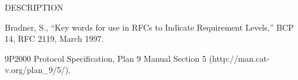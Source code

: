 DESCRIPTION

\begin{thebibliography}{0}

Bradner, S., ``Key words for use in RFCs to Indicate Requirement
Levels,'' BCP 14, RFC 2119, March 1997.


9P2000 Protocol Specification, Plan 9 Manual Section 5
(http:/\slash man.cat-v.org\slash plan\_9\slash 5\slash ).


\end{thebibliography}





